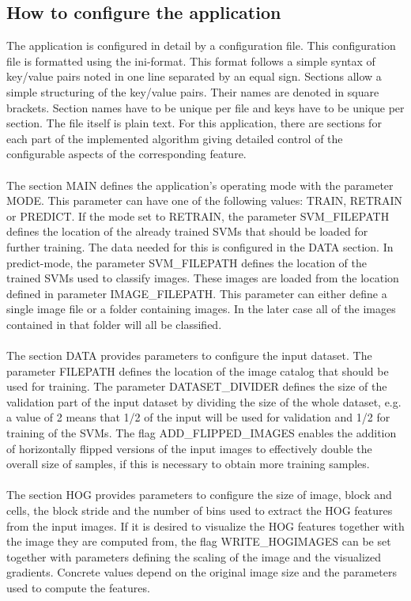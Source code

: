 \subsection{How to configure the application}
The application is configured in detail by a configuration file. This configuration file is formatted using the ini-format. This format follows a simple syntax of key/value pairs noted in one line separated by an equal sign. Sections allow a simple structuring of the key/value pairs. Their names are denoted in square brackets. Section names have to be unique per file and keys have to be unique per section. The file itself is plain text. For this application, there are sections for each part of the implemented algorithm giving detailed control of the configurable aspects of the corresponding feature.
\\
\\
The section MAIN defines the application's operating mode with the parameter MODE. This parameter can have one of the following values: TRAIN, RETRAIN or PREDICT. If the mode set to RETRAIN, the parameter SVM\_FILEPATH defines the location of the already trained SVMs that should be loaded for further training. The data needed for this is configured in the DATA section. In predict-mode, the parameter SVM\_FILEPATH defines the location of the trained SVMs used to classify images. These images are loaded from the location defined in parameter IMAGE\_FILEPATH. This parameter can either define a single image file or a folder containing images. In the later case all of the images contained in that folder will all be classified.
\\
\\
The section DATA provides parameters to configure the input dataset. The parameter FILEPATH defines the location of the image catalog that should be used for training. The parameter DATASET\_DIVIDER defines the size of the validation part of the input dataset by dividing the size of the whole dataset, e.g. a value of 2 means that 1/2 of the input will be used for validation and 1/2 for training of the SVMs. The flag ADD\_FLIPPED\_IMAGES enables the addition of horizontally flipped versions of the input images to effectively double the overall size of samples, if this is necessary to obtain more training samples.
\\
\\
The section HOG provides parameters to configure the size of image, block and cells, the block stride and the number of bins used to extract the HOG features from the input images. If it is desired to visualize the HOG features together with the image they are computed from, the flag WRITE\_HOGIMAGES can be set together with parameters defining the scaling of the image and the visualized gradients. Concrete values depend on the original image size and the parameters used to compute the features.
